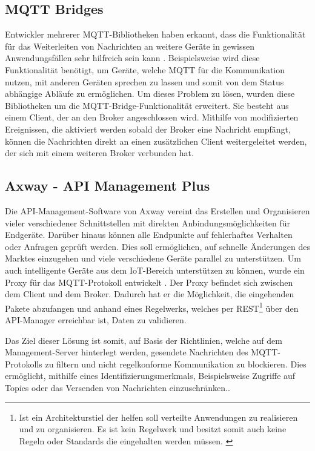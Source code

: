     \subsection{MQTT Bridges}
        Entwickler mehrerer MQTT-Bibliotheken haben erkannt, dass die Funktionalität für das Weiterleiten von Nachrichten an weitere Geräte in gewissen Anwendungsfällen sehr hilfreich sein kann \cite{84codes_ab_2016,light_2019}. Beispielsweise wird diese Funktionalität benötigt, um Geräte, welche \ac{MQTT} für die Kommunikation nutzen, mit anderen Geräten sprechen zu lassen und somit von dem Status abhängige Abläufe zu ermöglichen.
        Um dieses Problem zu lösen, wurden diese Bibliotheken um die MQTT-Bridge-Funktionalität erweitert. Sie besteht aus einem Client, der an den Broker angeschlossen wird. Mithilfe von modifizierten Ereignissen, die aktiviert werden sobald der Broker eine Nachricht empfängt, können die Nachrichten direkt an einen zusätzlichen Client weitergeleitet werden, der sich mit einem weiteren Broker verbunden hat.
    
    \subsection{Axway - API Management Plus}
        Die API-Management-Software von Axway vereint das Erstellen und Organisieren vieler verschiedener Schnittstellen mit direkten Anbindungsmöglichkeiten für Endgeräte. Darüber hinaus können alle Endpunkte auf fehlerhaftes Verhalten oder Anfragen geprüft werden. Dies soll ermöglichen, auf schnelle Änderungen des Marktes einzugehen und viele verschiedene Geräte parallel zu unterstützen.
        Um auch intelligente Geräte aus dem \ac{IoT}-Bereich unterstützen zu können, wurde ein Proxy für das \ac{MQTT}-Protokoll entwickelt \cite{axway_2018}. Der Proxy befindet sich zwischen dem Client und dem Broker. Dadurch hat er die Möglichkeit, die eingehenden Pakete abzufangen und anhand eines Regelwerks, welches per \ac{REST}\footnote{Ist ein Architekturstiel der helfen soll verteilte Anwendungen zu realisieren und zu organisieren. Es ist kein Regelwerk und besitzt somit auch keine Regeln oder Standards die eingehalten werden müssen. \cite{Doglio2015}} über den \acs{API}-Manager erreichbar ist, Daten zu validieren.
        
        Das Ziel dieser Lösung ist somit, auf Basis der Richtlinien, welche auf dem Management-Server hinterlegt werden, gesendete Nachrichten des \ac{MQTT}-Protokolls zu filtern und nicht regelkonforme Kommunikation zu blockieren. Dies ermöglicht, mithilfe eines Identifizierungsmerkmals, Beispielsweise Zugriffe auf Topics oder das Versenden von Nachrichten einzuschränken..
        
